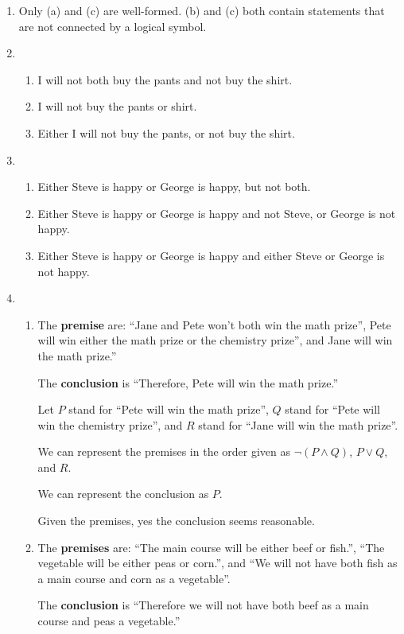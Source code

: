 \documentclass{article}
\begin{document}
\begin{enumerate}
\begin{enumerate}
  \end{enumerate}
\item Only (a) and (c) are well-formed.	 (b) and (c) both contain statements that are not connected by a logical symbol.
\item
  \begin{enumerate}
  \item I will not both buy the pants and not buy the shirt.
  \item I will not buy the pants or shirt.
  \item Either I will not buy the pants, or not buy the shirt.
  \end{enumerate}
\item
  \begin{enumerate}
  \item Either Steve is happy or George is happy, but not both.
  \item Either Steve is happy or George is happy and not Steve, or George is not happy.
  \item Either Steve is happy or George is happy and either Steve or George is not happy.
  \end{enumerate}
\item
  \begin{enumerate}
  \item The \textbf{premise} are: ``Jane and Pete won't both win the math prize'', Pete will win either the math prize or the chemistry prize'', and Jane will win the math prize.''

    The \textbf{conclusion} is ``Therefore, Pete will win the math prize.''

    Let $P$ stand for ``Pete will win the math prize'', $Q$ stand for ``Pete will win the chemistry prize'', and $R$ stand for ``Jane will win the math prize''.

    We can represent the premises in the order given as $\lnot (P \land Q)$, $P \lor Q$, and $R$.

    We can represent the conclusion as $P$.

    Given the premises, yes the conclusion seems reasonable.

  \item The \textbf{premises} are: ``The main course will be either beef or fish.'', ``The vegetable will be either peas or corn.'', and ``We will not have both fish as a main course and corn as a vegetable''.

    The \textbf{conclusion} is ``Therefore we will not have both beef as a main course and peas a vegetable.''


\end{enumerate}
\end{enumerate}
\end{document}
